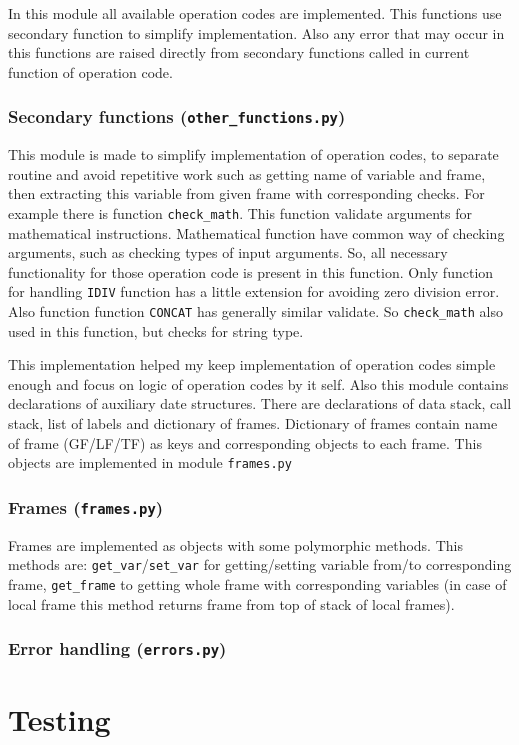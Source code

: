 \documentclass[10pt,a4paper]{article}
\begin{document}
In this module all available operation codes are implemented. This functions
use secondary function to simplify implementation. Also any error that may occur 
in this functions are raised directly from secondary functions called in current 
function of operation code.  

\subsubsection{Secondary functions (\texttt{other\_functions.py})}

This module is made to simplify implementation of operation codes, to separate 
routine and avoid repetitive work such as getting name of variable and frame, 
then extracting this variable from given frame with corresponding checks. For 
example there is function \texttt{check\_math}. This function validate arguments 
for mathematical instructions. Mathematical function have common way of checking 
arguments, such as checking types of input arguments. So, all necessary 
functionality for those operation code is present in this function. Only 
function for handling \texttt{IDIV} function has a little extension for avoiding 
zero division error. Also function function \texttt{CONCAT} has generally 
similar validate. So \texttt{check\_math} also used in this function, but checks 
for string type.

This implementation helped my keep implementation of operation codes simple enough 
and focus on logic of operation codes by it self. Also this module contains 
declarations of auxiliary  date structures. There are declarations of data stack, 
call stack, list of labels and dictionary of frames. Dictionary of frames 
contain name of frame (GF/LF/TF) as keys and corresponding  objects to each frame. 
This objects are implemented in module \texttt{frames.py}

\subsubsection{Frames (\texttt{frames.py})}

Frames are implemented as objects with some polymorphic methods. This methods are: 
\texttt{get\_var}/\texttt{set\_var} for getting/setting variable from/to 
corresponding frame, \texttt{get\_frame} to getting whole frame with corresponding 
variables (in case of local frame this method returns frame from top of stack of 
local frames). 

\subsubsection{Error handling (\texttt{errors.py})}



\section{Testing}
\end{document}

